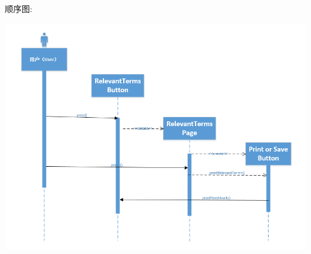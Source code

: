 \documentclass[11pt]{article}
\begin{document}
			顺序图: 
			\begin{center}
			\includegraphics[scale=0.42]{4.2顺序图.png}
			\end{center}
\end{document}
